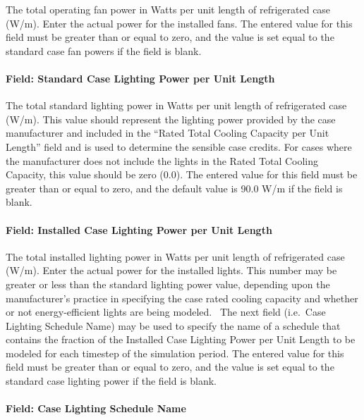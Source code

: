 The total operating fan power in Watts per unit length of refrigerated case (W/m). Enter the actual power for the installed fans. The entered value for this field must be greater than or equal to zero, and the value is set equal to the standard case fan powers if the field is blank.

\paragraph{Field: Standard Case Lighting Power per Unit Length}\label{field-standard-case-lighting-power-per-unit-length}

The total standard lighting power in Watts per unit length of refrigerated case (W/m). This value should represent the lighting power provided by the case manufacturer and included in the ``Rated Total Cooling Capacity per Unit Length'' field and is used to determine the sensible case credits. For cases where the manufacturer does not include the lights in the Rated Total Cooling Capacity, this value should be zero (0.0). The entered value for this field must be greater than or equal to zero, and the default value is 90.0 W/m if the field is blank.

\paragraph{Field: Installed Case Lighting Power per Unit Length}\label{field-installed-case-lighting-power-per-unit-length}

The total installed lighting power in Watts per unit length of refrigerated case (W/m). Enter the actual power for the installed lights. This number may be greater or less than the standard lighting power value, depending upon the manufacturer's practice in specifying the case rated cooling capacity and whether or not energy-efficient lights are being modeled.~ The next field (i.e.~Case Lighting Schedule Name) may be used to specify the name of a schedule that contains the fraction of the Installed Case Lighting Power per Unit Length to be modeled for each timestep of the simulation period. The entered value for this field must be greater than or equal to zero, and the value is set equal to the standard case lighting power if the field is blank.

\paragraph{Field: Case Lighting Schedule Name}\label{field-case-lighting-schedule-name}

